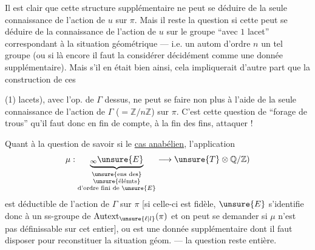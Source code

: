 Il est clair que cette structure supplémentaire ne peut se déduire
de la seule connaissance de l'action de \(u\) sur \(\pi\).
Mais il reste la question si cette 
peut se déduire de la connaissance de l'action
 de \(u\) sur le groupe
``avec \(1\) lacet'' correspondant à la situation géométrique
--- i.e. un autom 
 d'ordre \(n\)  un tel groupe
(ou si là encore il faut la considérer décidément comme une donnée
supplémentaire).
Mais s'il en était bien ainsi, cela impliquerait d'autre part que la
construction de ces 



(1) lacets), avec l'op. de \(\Gamma\) dessus, ne peut se faire non
plus à l'aide de la seule 
connaissance de l'action de \(\Gamma\) (\(=\mathbb Z/n\mathbb Z\))
sur \(\pi\).
C'est cette question de ``forage de trous'' qu'il faut donc en fin de
compte, à la fin des fins, attaquer !

Quant à la question de savoir si
 le \uline{cas anabélien},
l'application
\[
\mu:\underbrace{{}_\infty\unsure{E}}_{
\substack{\text{\unsure{ens des}}\\
\text{\unsure{élémts}}\\
\text{d'ordre fini de }\unsure{E}}}
\longrightarrow\unsure{T}\otimes\mathbb Q/\mathbb Z)
\]
est déductible de l'action de \(\Gamma\) sur \(\pi\)
[si celle-ci est fidèle, \(\unsure{E}\) s'identifie donc à un ss-groupe
de \(\operatorname{Autext}_{\unsure{\ell|l}}(\pi)\)
et on peut se demander si \(\mu\) n'est pas
 définissable sur cet  entier],
ou est une donnée supplémentaire dont il faut disposer pour
reconstituer la situation géom. --- la question reste entière.

